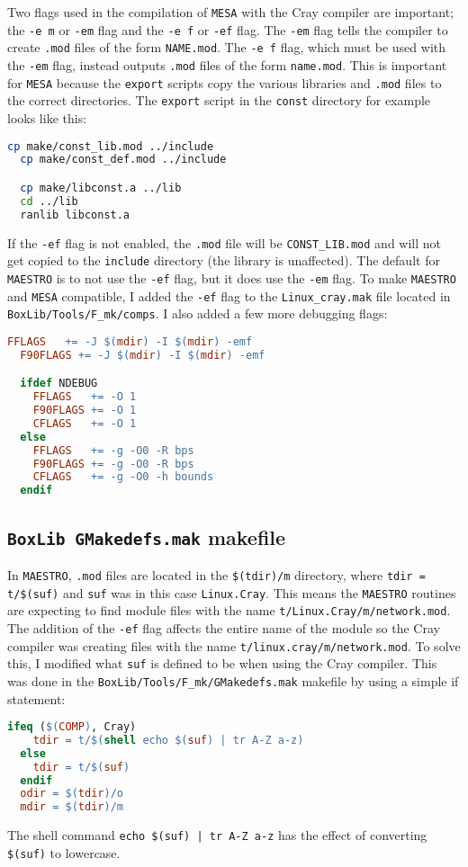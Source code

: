 Two flags used in the compilation of {\tt MESA} with the Cray compiler are 
important; the {\tt -e m} or {\tt -em} flag and the {\tt -e f} or {\tt -ef} 
flag. The {\tt -em} flag tells the compiler to create {\tt .mod} files of the 
form {\tt NAME.mod}. The {\tt -e f} flag, which must be used with the 
{\tt -em} flag, instead outputs {\tt .mod} files of the form {\tt name.mod}. 
This is important for {\tt MESA} because the {\tt export} scripts copy the 
various libraries and {\tt .mod} files to the correct directories. The 
{\tt export} script in the {\tt const} directory for example looks like this:
\begin{lstlisting}[language=bash,mathescape=false]
  cp make/const_lib.mod ../include
  cp make/const_def.mod ../include

  cp make/libconst.a ../lib
  cd ../lib
  ranlib libconst.a
\end{lstlisting}
If the {\tt -ef} flag is not enabled, the {\tt .mod} file will be 
{\tt CONST\_LIB.mod} and will not get copied to the {\tt include} directory 
(the library is unaffected). The default for {\tt MAESTRO} is to not use 
the {\tt -ef} flag, but it does use the {\tt -em} flag. To make {\tt MAESTRO} 
and {\tt MESA} compatible, I added the {\tt -ef} flag to the 
{\tt Linux\_cray.mak} file located in {\tt BoxLib/Tools/F\_mk/comps}. I also 
added a few more debugging flags:
\begin{lstlisting}[language=make,mathescape=false]
  FFLAGS   += -J $(mdir) -I $(mdir) -emf
  F90FLAGS += -J $(mdir) -I $(mdir) -emf

  ifdef NDEBUG
    FFLAGS   += -O 1
    F90FLAGS += -O 1
    CFLAGS   += -O 1
  else
    FFLAGS   += -g -O0 -R bps
    F90FLAGS += -g -O0 -R bps
    CFLAGS   += -g -O0 -h bounds
  endif 
\end{lstlisting}

\subsection{{\tt BoxLib GMakedefs.mak} makefile}

In {\tt MAESTRO}, {\tt .mod} files are located in the {\tt \$(tdir)/m} 
directory, where {\tt tdir = t/\$(suf)} and {\tt suf} was in this case 
{\tt Linux.Cray}. This means the {\tt MAESTRO} routines are expecting to find 
module files with the name {\tt t/Linux.Cray/m/network.mod}. The addition of 
the {\tt -ef} flag affects the entire name of the module so the Cray compiler 
was creating files with the name {\tt t/linux.cray/m/network.mod}. To solve 
this, I modified what {\tt suf} is defined to be when using the Cray compiler. 
This was done in the {\tt BoxLib/Tools/F\_mk/GMakedefs.mak} makefile by using 
a simple if statement:
\begin{lstlisting}[language=make,mathescape=false]
  ifeq ($(COMP), Cray)
    tdir = t/$(shell echo $(suf) | tr A-Z a-z)
  else
    tdir = t/$(suf)
  endif
  odir = $(tdir)/o
  mdir = $(tdir)/m
\end{lstlisting}
The shell command {\tt echo \$(suf) | tr A-Z a-z} has the effect of converting 
{\tt \$(suf)} to lowercase.

